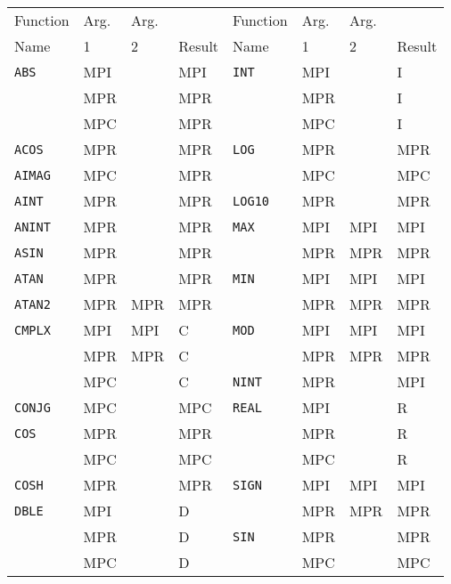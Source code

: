 \begin{table} \begin{center}
\begin{tabular}{|l|l|l|l|l|l|l|l|}
\hline
Function    & Arg. & Arg. &       & Function   & Arg. & Arg. & \\
Name        &  1   &  2   &Result & Name       &  1   &  2   &Result\\
\hline
{\tt ABS}   & MPI  &      & MPI   & {\tt INT}  & MPI  &      & I   \\
            & MPR  &      & MPR   &            & MPR  &      & I   \\
            & MPC  &      & MPR   &            & MPC  &      & I   \\
{\tt ACOS}  & MPR  &      & MPR   & {\tt LOG}  & MPR  &      & MPR \\
{\tt AIMAG} & MPC  &      & MPR   &            & MPC  &      & MPC \\
{\tt AINT}  & MPR  &      & MPR   & {\tt LOG10}& MPR  &      & MPR \\
{\tt ANINT} & MPR  &      & MPR   & {\tt MAX}  & MPI  & MPI  & MPI \\
{\tt ASIN}  & MPR  &      & MPR   &            & MPR  & MPR  & MPR \\
{\tt ATAN}  & MPR  &      & MPR   & {\tt MIN}  & MPI  & MPI  & MPI \\
{\tt ATAN2} & MPR  & MPR  & MPR   &            & MPR  & MPR  & MPR \\
{\tt CMPLX} & MPI  & MPI  & C     & {\tt MOD}  & MPI  & MPI  & MPI \\
            & MPR  & MPR  & C     &            & MPR  & MPR  & MPR \\
            & MPC  &      & C     & {\tt NINT} & MPR  &      & MPI \\
{\tt CONJG} & MPC  &      & MPC   & {\tt REAL} & MPI  &      & R   \\
{\tt COS}   & MPR  &      & MPR   &            & MPR  &      & R   \\
            & MPC  &      & MPC   &            & MPC  &      & R   \\
{\tt COSH}  & MPR  &      & MPR   & {\tt SIGN} & MPI  & MPI  & MPI \\
{\tt DBLE}  & MPI  &      & D     &            & MPR  & MPR  & MPR \\
            & MPR  &      & D     & {\tt SIN}  & MPR  &      & MPR \\
            & MPC  &      & D     &            & MPC  &      & MPC \\

\end{tabular}
\end{center}
\end{table}
